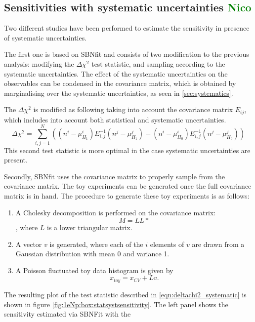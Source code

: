 \documentclass[a4paper]{article}
\begin{document}
\subsection{Sensitivities with systematic uncertainties \textcolor{green}{Nico}}
\label{subsec:sensitivity_syst_uncertainty}
Two different studies have been performed to estimate the sensitivity in presence of systematic uncertainties.

The first one is based on SBNfit and consists of two modification to the previous analysis: modifying the $\Delta \chi^2$ test statistic, and sampling according to the systematic uncertainties.
The effect of the systematic uncertainties on the observables can be condensed in the covariance matrix, which is obtained by marginalising over the systematic uncertainties, as seen in \ref{sec:systematics}.

The $\Delta \chi^2$ is modified as following taking into account the covariance matrix $E_{ij}$, which includes into account both statistical and systematic uncertainties.
\begin{equation}
\label{eqn:deltachi2_systematic}
\Delta\chi^2 = \sum_{i,j=1}^{N}\left( (n^i - \mu^i_{H_1})E_{i,j}^{-1}(n^j - \mu^j_{H_1}) - (n^i - \mu^i_{H_0})E_{i,j}^{-1}(n^j - \mu^j_{H_0})\right)
\end{equation}
This second test statistic is more optimal in the case systematic uncertainties are present.

Secondly, SBNfit uses the covariance matrix to properly sample from the covariance matrix.
The toy experiments can be generated once the full covariance matrix is in hand. The procedure to generate these toy experiments is as follows:
\begin{enumerate}
    \item A Cholesky decomposition is performed on the covariance matrix: $$M = LL*$$,
    where $L$ is a lower triangular matrix.
    \item A vector $v$ is generated, where each of the $i$ elements of $v$ are drawn from a Gaussian distribution with mean 0 and variance 1.
    \item A Poisson fluctuated toy data histogram is given by
$$x_{toy} = x_{CV} + Lv.$$
\end{enumerate}

The resulting plot of the test statistic described in \ref{eqn:deltachi2_systematic} is shown in figure \ref{fig:1eNp:box:statsystsensitivity}. The left panel shows the sensitivity estimated via SBNFit with the 
\end{document}

